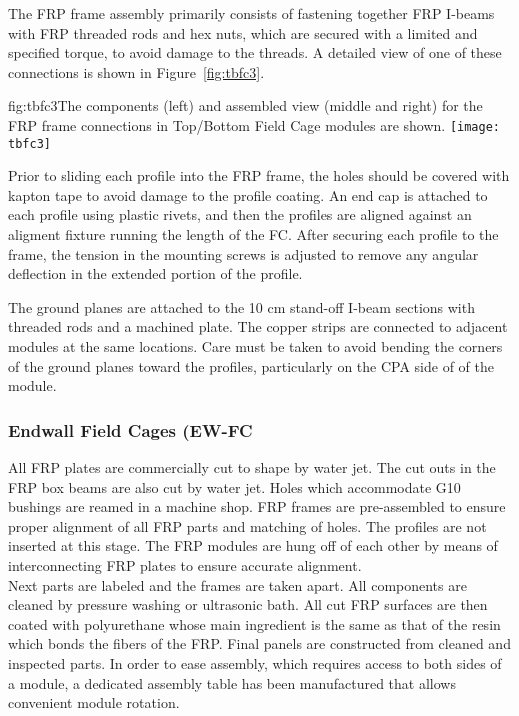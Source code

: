The FRP frame assembly primarily consists of fastening together FRP I-beams with FRP threaded rods and hex nuts, which are secured with a limited and specified torque, to avoid damage to the threads. A detailed view of one of these connections is shown in Figure~\ref{fig:tbfc3}.

\begin{dunefigure}{fig:tbfc3}{The components (left) and assembled view (middle and right) for the FRP frame connections in Top/Bottom Field Cage modules are shown.}
\texttt{[image: tbfc3]}
\end{dunefigure}

Prior to sliding each profile into the FRP frame, the holes should be covered with kapton tape to avoid damage to the profile coating. An end cap is attached to each profile using plastic rivets, and then the profiles are aligned against an aligment fixture running the length of the FC. After securing each profile to the frame, the tension in the mounting screws is adjusted to remove any angular deflection in the extended portion of the profile.

The ground planes are attached to the 10 cm stand-off I-beam sections with threaded rods and a machined plate. The copper strips are connected to adjacent modules at the same locations. Care must be taken to avoid bending the corners of the ground planes toward the profiles, particularly on the CPA side of of the module.

\subsubsection{Endwall Field Cages (EW-FC}

All FRP plates are commercially cut to shape by water jet. The cut outs in the FRP box beams are also cut by water jet. Holes which accommodate G10 bushings are reamed in a machine shop. FRP frames are pre-assembled to ensure proper alignment of all FRP parts and matching of holes. The profiles are not inserted at this stage. The FRP modules are hung off of each other by means of interconnecting FRP plates to ensure accurate alignment.\\

Next  parts are labeled and the frames are taken apart. All components are cleaned by pressure washing or ultrasonic bath. All cut FRP surfaces are then coated with polyurethane whose main ingredient is the same as that of the resin which bonds
the fibers of the FRP. Final panels are constructed from cleaned and inspected parts. In order to ease assembly, which requires access to both sides of a module,
a dedicated assembly table has been manufactured that allows convenient module rotation. 

